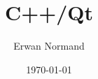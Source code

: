 \documentclass[a4paper,12pt]{report}
\title{C++/Qt}
\author{Erwan Normand}
\date{\today}
\begin{document}
\frontmatter
\pagedetitre

\tableofcontents %


\mainmatter





\appendix

\backmatter

\listoffigures
\end{document}
